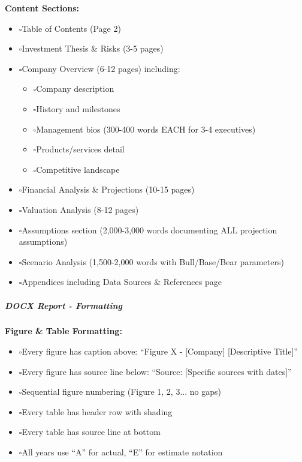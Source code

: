 \documentclass[11pt]{article}
\newcommand{\UncheckedBox}{$\square$}
\begin{document}
\textbf{Content Sections:}

\begin{itemize}[leftmargin=*,itemsep=2pt,topsep=2pt]
\item {} \UncheckedBox Table of Contents (Page 2)
\item {} \UncheckedBox Investment Thesis \& Risks (3-5 pages)
\item {} \UncheckedBox Company Overview (6-12 pages) including:
\begin{itemize}[leftmargin=*,itemsep=2pt,topsep=2pt]
\item {} \UncheckedBox Company description
\item {} \UncheckedBox History and milestones
\item {} \UncheckedBox Management bios (300-400 words EACH for 3-4 executives)
\item {} \UncheckedBox Products/services detail
\item {} \UncheckedBox Competitive landscape
\end{itemize}
\item {} \UncheckedBox Financial Analysis \& Projections (10-15 pages)
\item {} \UncheckedBox Valuation Analysis (8-12 pages)
\item {} \UncheckedBox Assumptions section (2,000-3,000 words documenting ALL projection assumptions)
\item {} \UncheckedBox Scenario Analysis (1,500-2,000 words with Bull/Base/Bear parameters)
\item {} \UncheckedBox Appendices including Data Sources \& References page
\end{itemize}

\subparagraph{DOCX Report - Formatting}\mbox{}\par

\textbf{Figure \& Table Formatting:}

\begin{itemize}[leftmargin=*,itemsep=2pt,topsep=2pt]
\item {} \UncheckedBox Every figure has caption above: ``Figure X - [Company] [Descriptive Title]''
\item {} \UncheckedBox Every figure has source line below: ``Source: [Specific sources with dates]''
\item {} \UncheckedBox Sequential figure numbering (Figure 1, 2, 3... no gaps)
\item {} \UncheckedBox Every table has header row with shading
\item {} \UncheckedBox Every table has source line at bottom
\item {} \UncheckedBox All years use ``A'' for actual, ``E'' for estimate notation
\end{itemize}
\end{document}
